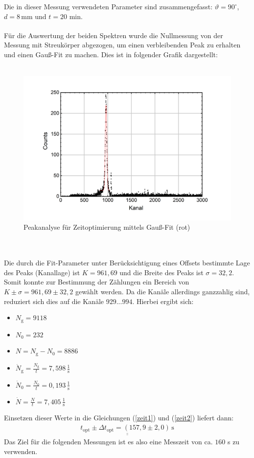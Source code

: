 \documentclass[german,  %
parskip=full,  %
]{scrartcl}
\begin{document}
Die in dieser Messung verwendeten Parameter sind zusammengefasst: $\vartheta = 90^{\circ}$, $d=8 \, \text{mm}$ und $t=20$ min.
\\\\
Für die Auswertung der beiden Spektren wurde die Nullmessung von der Messung mit Streukörper abgezogen, um einen verbleibenden Peak zu erhalten und einen Gauß-Fit zu machen. Dies ist in folgender Grafik dargestellt:
\\\\
\begin{figure}[h!]\centering
\includegraphics[scale=0.5]{zeitoptimierung}
\caption{Peakanalyse für Zeitoptimierung mittels Gauß-Fit (rot)}
\end{figure}
\\\\
Die durch die Fit-Parameter unter Berücksichtigung eines Offsets bestimmte Lage des Peaks (Kanallage) ist $K= 961,69$ und die Breite des Peaks ist $\sigma=32,2$. Somit konnte zur Bestimmung der Zählungen ein Bereich von $K \pm \sigma = 961,69 \pm 32,2$ gewählt werden. Da die Kanäle allerdings ganzzahlig sind, reduziert sich dies auf die Kanäle $929...994$. Hierbei ergibt sich:
\begin{itemize}
\item $N_{\text{g}} = 9118$
\item $N_0 = 232$
\item $N= N_{\text{g}}-N_0 = 8886$
\item $\dot{N}_{\text{g}} = \frac{N_{\text{g}}}{t} = 7,598 \, \frac{1}{\text{s}}$
\item $\dot{N}_{0} = \frac{N_{0}}{t} = 0,193 \, \frac{1}{\text{s}}$
\item $\dot{N} = \frac{N}{t} = 7,405 \, \frac{1}{\text{s}}$
\end{itemize} 
Einsetzen dieser Werte in die Gleichungen (\ref{zeit1}) und (\ref{zeit2}) liefert dann:
\begin{align}
\underline{\underline{t_{\text{opt}} \pm \Delta t_{\text{opt}} = (157,9 \pm 2,0) \, \text{s}}}
\end{align}
Das Ziel für die folgenden Messungen ist es also eine Messzeit von ca. $160$ s zu verwenden.
\end{document}
